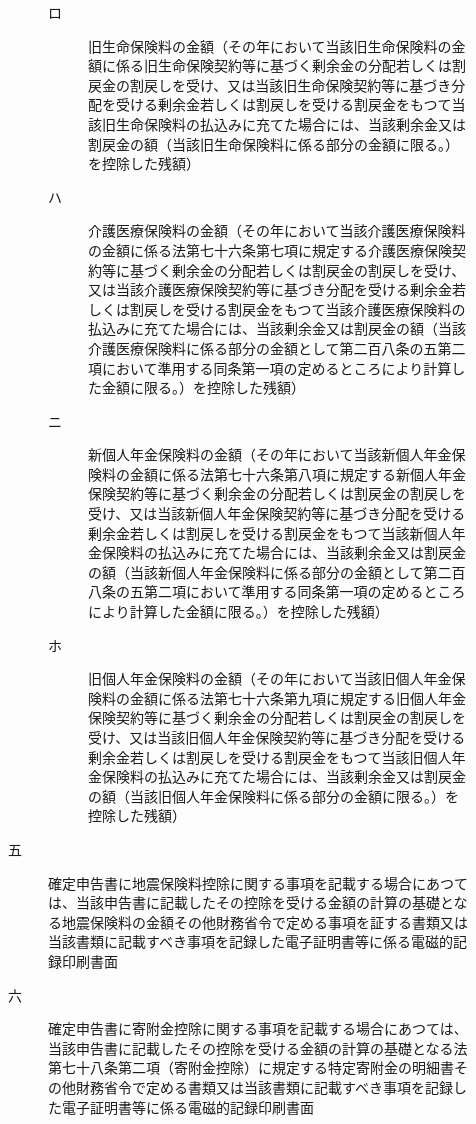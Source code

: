\documentclass[twocolumn,a4j,10pt]{ltjtarticle}
\begin{document}
\begin{description}
\begin{description}
\begin{description}
\item[ロ]旧生命保険料の金額（その年において当該旧生命保険料の金額に係る旧生命保険契約等に基づく剰余金の分配若しくは割戻金の割戻しを受け、又は当該旧生命保険契約等に基づき分配を受ける剰余金若しくは割戻しを受ける割戻金をもつて当該旧生命保険料の払込みに充てた場合には、当該剰余金又は割戻金の額（当該旧生命保険料に係る部分の金額に限る。）を控除した残額）
\item[ハ]介護医療保険料の金額（その年において当該介護医療保険料の金額に係る法第七十六条第七項に規定する介護医療保険契約等に基づく剰余金の分配若しくは割戻金の割戻しを受け、又は当該介護医療保険契約等に基づき分配を受ける剰余金若しくは割戻しを受ける割戻金をもつて当該介護医療保険料の払込みに充てた場合には、当該剰余金又は割戻金の額（当該介護医療保険料に係る部分の金額として第二百八条の五第二項において準用する同条第一項の定めるところにより計算した金額に限る。）を控除した残額）
\item[ニ]新個人年金保険料の金額（その年において当該新個人年金保険料の金額に係る法第七十六条第八項に規定する新個人年金保険契約等に基づく剰余金の分配若しくは割戻金の割戻しを受け、又は当該新個人年金保険契約等に基づき分配を受ける剰余金若しくは割戻しを受ける割戻金をもつて当該新個人年金保険料の払込みに充てた場合には、当該剰余金又は割戻金の額（当該新個人年金保険料に係る部分の金額として第二百八条の五第二項において準用する同条第一項の定めるところにより計算した金額に限る。）を控除した残額）
\item[ホ]旧個人年金保険料の金額（その年において当該旧個人年金保険料の金額に係る法第七十六条第九項に規定する旧個人年金保険契約等に基づく剰余金の分配若しくは割戻金の割戻しを受け、又は当該旧個人年金保険契約等に基づき分配を受ける剰余金若しくは割戻しを受ける割戻金をもつて当該旧個人年金保険料の払込みに充てた場合には、当該剰余金又は割戻金の額（当該旧個人年金保険料に係る部分の金額に限る。）を控除した残額）
\end{description}
\item[五]確定申告書に地震保険料控除に関する事項を記載する場合にあつては、当該申告書に記載したその控除を受ける金額の計算の基礎となる地震保険料の金額その他財務省令で定める事項を証する書類又は当該書類に記載すべき事項を記録した電子証明書等に係る電磁的記録印刷書面
\item[六]確定申告書に寄附金控除に関する事項を記載する場合にあつては、当該申告書に記載したその控除を受ける金額の計算の基礎となる法第七十八条第二項（寄附金控除）に規定する特定寄附金の明細書その他財務省令で定める書類又は当該書類に記載すべき事項を記録した電子証明書等に係る電磁的記録印刷書面
\end{description}

\end{description}
\end{document}
